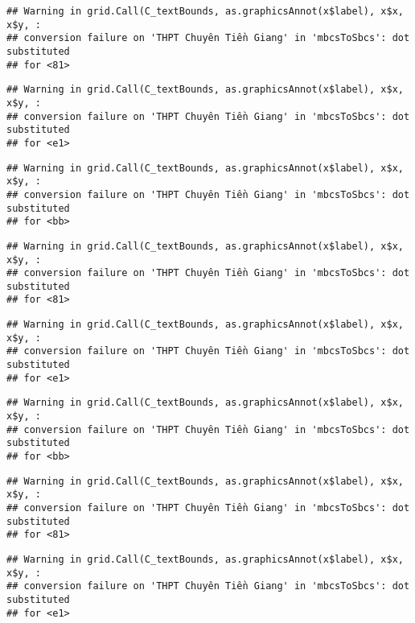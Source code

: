 \documentclass[
]{article}
\begin{document}
\begin{verbatim}
## Warning in grid.Call(C_textBounds, as.graphicsAnnot(x$label), x$x, x$y, :
## conversion failure on 'THPT Chuyên Tiền Giang' in 'mbcsToSbcs': dot substituted
## for <81>
\end{verbatim}

\begin{verbatim}
## Warning in grid.Call(C_textBounds, as.graphicsAnnot(x$label), x$x, x$y, :
## conversion failure on 'THPT Chuyên Tiền Giang' in 'mbcsToSbcs': dot substituted
## for <e1>
\end{verbatim}

\begin{verbatim}
## Warning in grid.Call(C_textBounds, as.graphicsAnnot(x$label), x$x, x$y, :
## conversion failure on 'THPT Chuyên Tiền Giang' in 'mbcsToSbcs': dot substituted
## for <bb>
\end{verbatim}

\begin{verbatim}
## Warning in grid.Call(C_textBounds, as.graphicsAnnot(x$label), x$x, x$y, :
## conversion failure on 'THPT Chuyên Tiền Giang' in 'mbcsToSbcs': dot substituted
## for <81>
\end{verbatim}

\begin{verbatim}
## Warning in grid.Call(C_textBounds, as.graphicsAnnot(x$label), x$x, x$y, :
## conversion failure on 'THPT Chuyên Tiền Giang' in 'mbcsToSbcs': dot substituted
## for <e1>
\end{verbatim}

\begin{verbatim}
## Warning in grid.Call(C_textBounds, as.graphicsAnnot(x$label), x$x, x$y, :
## conversion failure on 'THPT Chuyên Tiền Giang' in 'mbcsToSbcs': dot substituted
## for <bb>
\end{verbatim}

\begin{verbatim}
## Warning in grid.Call(C_textBounds, as.graphicsAnnot(x$label), x$x, x$y, :
## conversion failure on 'THPT Chuyên Tiền Giang' in 'mbcsToSbcs': dot substituted
## for <81>
\end{verbatim}

\begin{verbatim}
## Warning in grid.Call(C_textBounds, as.graphicsAnnot(x$label), x$x, x$y, :
## conversion failure on 'THPT Chuyên Tiền Giang' in 'mbcsToSbcs': dot substituted
## for <e1>
\end{verbatim}
\end{document}
